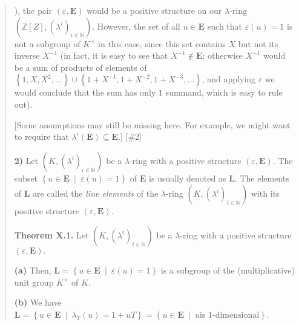 \documentclass[numbers=enddot,12pt,final,onecolumn,notitlepage]{scrartcl}%
\begin{document}
\begin{quote}
{\cite{FulLan85}), the pair $\left(  \varepsilon,\mathbf{E}\right)  $ would be
a positive structure on our $\lambda$-ring $\left(  \mathbb{Z}\left[
Z\right]  ,\left(  \lambda^{i}\right)  _{i\in\mathbb{N}}\right)  $. However,
the set of all $u\in\mathbf{E}$ such that $\varepsilon\left(  u\right)  =1$ is
not a subgroup of $K^{\times}$ in this case, since this set contains $X$ but
not its inverse $X^{-1}$ (in fact, it is easy to see that $X^{-1}%
\notin\mathbf{E}$; otherwise $X^{-1}$ would be a sum of products of elements
of $\left\{  1,X,X^{2},...\right\}  \cup\left\{  1+X^{-1},1+X^{-2}%
,1+X^{-3},...\right\}  $, and applying $\varepsilon$ we would conclude that
the sum has only $1$ summand, which is easy to rule out).}

[Some assumptions may still be missing here. For example, we might want to
require that $\lambda^{i}\left(  \mathbf{E}\right)  \subseteq\mathbf{E}$.] [\#2]

\textbf{2)} Let $\left(  K,\left(  \lambda^{i}\right)  _{i\in\mathbb{N}%
}\right)  $ be a $\lambda$-ring with a positive structure $\left(
\varepsilon,\mathbf{E}\right)  .$ The subset $\left\{  u\in\mathbf{E}%
\ \mid\ \varepsilon\left(  u\right)  =1\right\}  $ of $\mathbf{E}$ is usually
denoted as $\mathbf{L}$. The elements of $\mathbf{L}$ are called the
\textit{line elements} of the $\lambda$-ring $\left(  K,\left(  \lambda
^{i}\right)  _{i\in\mathbb{N}}\right)  $ with its positive structure $\left(
\varepsilon,\mathbf{E}\right)  $.

\textbf{Theorem X.1.} Let $\left(  K,\left(  \lambda^{i}\right)
_{i\in\mathbb{N}}\right)  $ be a $\lambda$-ring with a positive structure
$\left(  \varepsilon,\mathbf{E}\right)  .$

\textbf{(a)} Then, $\mathbf{L}=\left\{  u\in\mathbf{E}\ \mid\ \varepsilon
\left(  u\right)  =1\right\}  $ is a subgroup of the (multiplicative) unit
group $K^{\times}$ of $K$.

\textbf{(b)} We have $\mathbf{L}=\left\{  u\in\mathbf{E}\ \mid\ \lambda
_{T}\left(  u\right)  =1+uT\right\}  =\left\{  u\in\mathbf{E}\ \mid\ u\text{
is }1\text{-dimensional}\right\}  $.
\end{quote}
\end{document}
